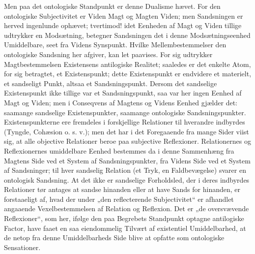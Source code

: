 \documentclass[11pt]{book}
\newcommand{\opage}[1]{\marginnote{\footnotesize\textit{[#1]}}}
\begin{document}
Men paa det ontologiske Standpunkt er denne Dualisme
\opage{258} \setcounter{footnote}{0}%
hævet. For den ontologiske Subjectivitet er Viden Magt og Magten
Viden; men Sandsningen er herved ingenlunde ophævet; tvertimod! idet
Eenheden af Magt og Viden tillige udtrykker en Modsætning, betegner
Sandsningen det i denne Modsætningseenhed Umiddelbare, seet fra Videns
Synspunkt. Hvilke Mellembestemmelser den ontologiske Sandsning her
afgiver, kan let paavises. For sig udtrykker Magtbestemmelsen
Existensens antilogiske Realitet; saaledes er det enkelte Atom, for sig
betragtet, et Existenspunkt; dette Existenspunkt er endvidere et
materielt, et sandseligt Punkt, altsaa et Sandsningspunkt. Dersom det
sandselige Existenspunkt ikke tillige var et Sandsningspunkt, saa var
her ingen Eenhed af Magt og Viden; men i Conseqvens af Magtens og
Videns Eenhed gjælder det: saamange sandselige Existenspunkter,
saamange ontologiske Sandsningspunkter. Existenspunkterne ere
fremdeles i forskjellige Relationer til hverandre indbyrdes (Tyngde,
Cohæsion o. s. v.); men det har i det Foregaaende fra mange Sider viist
sig, at alle objective Relationer beroe paa subjective Reflexioner.
Relationernes og Reflexionernes umiddelbare Eenhed bestemmes da i denne
Sammenhæng fra Magtens Side ved et System af Sandsningspunkter, fra
Videns Side ved et System af Sandsninger; til hver sandselig Relation
(et Tryk, en Faldbevægelse) svarer en ontologisk Sandsning. At det ikke
er sandselige Forholdsled, der i deres indbyrdes Relationer tør antages
at sandse hinanden eller at have Sands for hinanden, er forstaaeligt
af, hvad der under „den reflecterende Subjectivitet“ er afhandlet
angaaende Vexelbestemmelsen af Relation og Reflexion. Det er „de
oversvævende Reflexioner“, som her, ifølge den paa Begrebets Standpunkt
optagne antilogiske Factor, have faaet en saa eiendommelig Tilvært af
existentiel Umiddelbarhed, at de netop fra denne Umiddelbarheds Side
blive at opfatte som ontologiske Sensationer.
\end{document}
